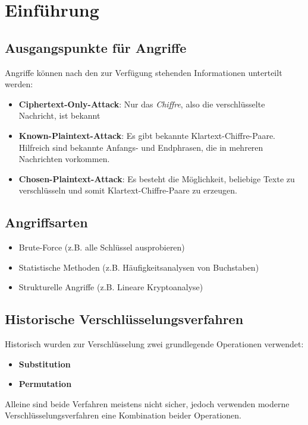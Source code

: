 \documentclass[12pt,A4]{extarticle}
\newcommand{\highlight}[1]{\textcolor{highlightColor}{\textbf{#1}}}
\begin{document}
\disclaimer

\tableofcontents
\clearpage

\section{Einführung}
\subsection{Ausgangspunkte für Angriffe}
Angriffe können nach den zur Verfügung stehenden Informationen unterteilt werden:
\begin{itemize}
  \item{\highlight{Ciphertext-Only-Attack}: Nur das \textit{Chiffre}, also die verschlüsselte Nachricht, ist bekannt}
  \item{\highlight{Known-Plaintext-Attack}: Es gibt bekannte Klartext-Chiffre-Paare. Hilfreich sind bekannte Anfangs- und Endphrasen, die in mehreren Nachrichten vorkommen.}
  \item{\highlight{Chosen-Plaintext-Attack}: Es besteht die Möglichkeit, beliebige Texte zu verschlüsseln und somit Klartext-Chiffre-Paare zu erzeugen.}
\end{itemize}

\subsection{Angriffsarten}
\begin{itemize}
  \item{Brute-Force (z.B. alle Schlüssel ausprobieren)}
  \item{Statistische Methoden (z.B. Häufigkeitsanalysen von Buchstaben)}
  \item{Strukturelle Angriffe (z.B. Lineare Kryptoanalyse)}
\end{itemize}

\subsection{Historische Verschlüsselungsverfahren}
Historisch wurden zur Verschlüsselung zwei grundlegende Operationen verwendet:
\begin{itemize}
  \item{\highlight{Substitution}}
  \item{\highlight{Permutation}}
\end{itemize}
Alleine sind beide Verfahren meistens nicht sicher, jedoch verwenden moderne Verschlüsselungsverfahren eine Kombination beider Operationen.
\end{document}
